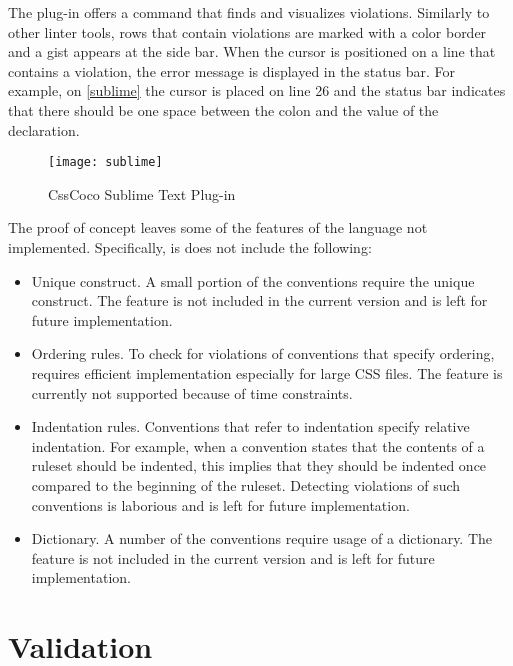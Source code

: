 The plug-in offers a command that finds and visualizes violations. Similarly to
other linter tools, rows that contain violations are marked with a color
border and a gist appears at the side bar. When the cursor is positioned on a
line that contains a violation, the error message is displayed in the status
bar. For example, on \autoref{sublime} the cursor is placed on line 26 and the
status bar indicates that there should be one space between the colon and the
value of the declaration.

\begin{figure}[h]
  \centering
  \caption{
    \label{sublime}
    CssCoco Sublime Text Plug-in}
  \texttt{[image: sublime]}
\end{figure}

The proof of concept leaves some of the features of the language not implemented. Specifically, is does not include the following:

\begin{itemize}

\item Unique construct. A small portion of the conventions require the unique construct. The feature is not included in the current version and is left for future implementation.

\item Ordering rules. To check for violations of conventions that specify ordering, requires efficient implementation especially for large CSS files. The feature is currently not supported because of time constraints. 

\item Indentation rules. Conventions that refer to indentation specify relative indentation. For example, when a convention states that the contents of a ruleset should be indented, this implies that they should be indented once compared to the beginning of the ruleset. Detecting violations of such conventions is laborious and is left for future implementation.

\item Dictionary. A number of the conventions require usage of a dictionary. The feature is not included in the current version and is left for future implementation.

\end{itemize}

\section{Validation}

